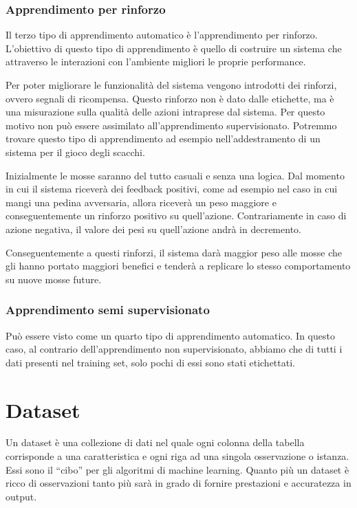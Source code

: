 \documentclass[12pt,italian]{report}
\begin{document}
\subsection{Apprendimento per rinforzo}
Il terzo tipo di apprendimento automatico è l’apprendimento per rinforzo. L’obiettivo di questo tipo di apprendimento è quello di costruire un sistema che attraverso le interazioni con l’ambiente migliori le proprie performance. \cite{unsupervisedlearning}

Per poter migliorare le funzionalità del sistema vengono introdotti dei rinforzi, ovvero segnali di ricompensa. Questo rinforzo non è dato dalle etichette, ma è una misurazione sulla qualità delle azioni intraprese dal sistema. Per questo motivo non può essere assimilato all'apprendimento supervisionato.
Potremmo trovare questo tipo di apprendimento ad esempio nell’addestramento di un sistema per il gioco degli scacchi.

Inizialmente le mosse saranno del tutto casuali e senza una logica. Dal momento in cui il sistema riceverà dei feedback positivi, come ad esempio nel caso in cui mangi una pedina avversaria, allora riceverà un peso maggiore e conseguentemente un rinforzo positivo su quell’azione. Contrariamente in caso di azione negativa, il valore dei pesi su quell’azione andrà in decremento.

Conseguentemente a questi rinforzi, il sistema darà maggior peso alle mosse che gli hanno portato maggiori benefici e tenderà a replicare lo stesso comportamento su nuove mosse future.
\subsection{Apprendimento semi supervisionato}
Può essere visto come un quarto tipo di apprendimento automatico. In questo caso, al contrario dell’apprendimento non supervisionato, abbiamo che di tutti i dati presenti nel training set, solo pochi di essi sono stati etichettati.\cite{semisupervised}



\chapter{Dataset}
Un dataset è una collezione di dati nel quale ogni colonna della tabella corrisponde a una caratteristica e ogni riga ad una singola osservazione o istanza. Essi sono il ``cibo'' per gli algoritmi di machine learning. Quanto più un dataset è ricco di osservazioni tanto più sarà in grado di fornire prestazioni e accuratezza in output.
\end{document}
